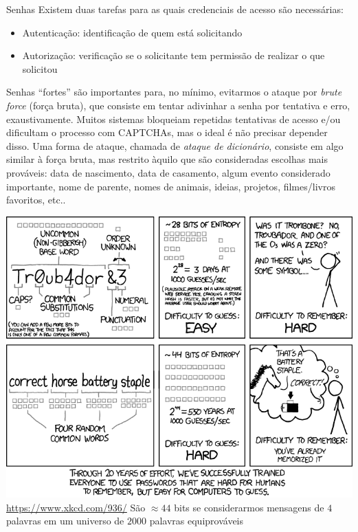 \documentclass[utf8]{beamer}
\begin{document}
\begin{frame}{Senhas}
  Existem duas tarefas para as quais
  credenciais de acesso são necessárias:
  \begin{itemize}
    \item Autenticação: identificação de quem está solicitando
    \item Autorização: verificação se o solicitante tem permissão
                       de realizar o que solicitou
  \end{itemize}
  \vfill
  Senhas ``fortes'' são importantes para, no mínimo,
  evitarmos o ataque por \emph{brute force} (força bruta),
  que consiste em tentar adivinhar a senha por tentativa e erro,
  exaustivamente.
  Muitos sistemas bloqueiam repetidas tentativas de acesso
  e/ou dificultam o processo com CAPTCHAs,
  mas o ideal é não precisar depender disso.
  \vfill
  Uma forma de ataque, chamada de \emph{ataque de dicionário},
  consiste em algo similar à força bruta,
  mas restrito àquilo que são consideradas escolhas mais prováveis:
  data de nascimento, data de casamento,
  algum evento considerado importante, nome de parente,
  nomes de animais, ideias, projetos, filmes/livros favoritos, etc..
\end{frame}


\begin{frame}
  \centering
  \includegraphics[width=.8\textwidth]{password_strength.png}
  \url{https://www.xkcd.com/936/}
  \vfill
  São $\approx 44$ bits se considerarmos mensagens de $4$ palavras
   em um universo de $2000$ palavras equiprováveis
\end{frame}
\end{document}

